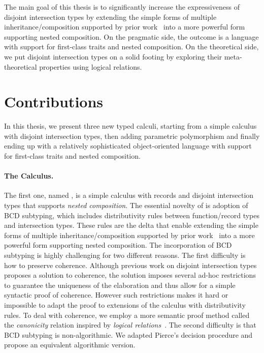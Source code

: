 The main goal of this thesis is to significantly increase the expressiveness of
disjoint intersection types by extending the simple forms of multiple
inheritance/composition supported by prior work~\citep{alpuimdisjoint, oliveira2016disjoint} into a more powerful form
supporting nested composition. On the pragmatic side, the outcome is a language
with support for first-class traits and nested composition. On the theoretical
side, we put disjoint intersection types on a solid footing by exploring their
meta-theoretical properties using logical relations.


\section{Contributions}

In this thesis, we present three new typed calculi, starting from a simple
calculus with disjoint intersection types, then adding parametric polymorphism
and finally ending up with a relatively sophisticated object-oriented language
with support for first-class traits and nested composition.

\paragraph{The \namee Calculus.}

The first one, named \namee, is a simple calculus with records and disjoint
intersection types that supports \emph{nested composition}. The essential
novelty of \namee is adoption of BCD subtyping, which includes distributivity
rules between function/record types and intersection types. These rules are the
delta that enable extending the simple forms of multiple inheritance/composition
supported by prior work~\citep{oliveira2016disjoint} into a more powerful form
supporting nested composition. The incorporation of BCD subtyping is highly
challenging for two different reasons. The first difficulty is how to preserve
coherence. Although previous work on disjoint intersection types proposes a
solution to coherence, the solution imposes several ad-hoc restrictions to
guarantee the uniqueness of the elaboration and thus allow for a simple
syntactic proof of coherence. However such restrictions makes it hard or
impossible to adapt the proof to extensions of the calculus with distributivity
rules. To deal with coherence, we employ a more semantic proof method called the
\textit{canonicity} relation inspired by \emph{logical relations}~\citep{tait,
  plotkin1973lambda, statman1985logical}. The second difficulty is that BCD
subtyping is non-algorithmic. We adapted Pierce's decision procedure and propose
an equivalent algorithmic version.

